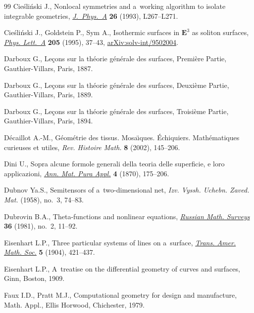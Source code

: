 \documentclass[pdftex]{sigma}
\numberwithin{equation}{section}
\begin{document}
\begin{thebibliography}{99}
Cie\'sli\'nski J., Nonlocal symmetries and a~working algorithm to isolate
  integrable geometries, \href{https://doi.org/10.1088/0305-4470/26/5/017}{\textit{J.~Phys.~A}} \textbf{26} (1993), L267--L271.

Cie\'sli\'nski J., Goldstein P., Sym A., Isothermic surfaces in
  {$\mathbf{E}^3$} as soliton surfaces, \href{https://doi.org/10.1016/0375-9601(95)00504-V}{\textit{Phys. Lett.~A}} \textbf{205}
  (1995), 37--43, \href{https://arxiv.org/abs/solv-int/9502004}{arXiv:solv-int/9502004}.

Darboux G., Le\c{c}ons sur la th\'eorie g\'en\'erale des surfaces, Premi\`ere
  Partie, Gauthier-Villars, Paris, 1887.

Darboux G., Le\c{c}ons sur la th\'eorie g\'en\'erale des surfaces, Deuxi\`eme
  Partie, Gauthier-Villars, Paris, 1889.

Darboux G., Le\c{c}ons sur la th\'eorie g\'en\'erale des surfaces, Troisi\`eme
  Partie, Gauthier-Villars, Paris, 1894.

D\'ecaillot A.-M., G\'eom\'etrie des tissus. {M}osa\"{\i}ques. \'Echiquiers.
  {M}ath\'ematiques curieuses et utiles, \textit{Rev. Histoire Math.}
  \textbf{8} (2002), 145--206.

Dini U., Sopra alcune formole generali della teoria delle superficie, e loro
  applicazioni, \href{https://doi.org/10.1007/BF02420031}{\textit{Ann. Mat. Pura Appl.}} \textbf{4} (1870), 175--206.

Dubnov Ya.S., Semitensors of a~two-dimensional net, \textit{Izv. Vyssh. Uchebn.
  Zaved. Mat.}  (1958), no.~3, 74--83.

Dubrovin B.A., Theta-functions and nonlinear equations, \href{https://doi.org/10.1070/RM1981v036n02ABEH002596}{\textit{Russian Math.
  Surveys}} \textbf{36} (1981), no.~2, 11--92.

Eisenhart L.P., Three particular systems of lines on a~surface, \href{https://doi.org/10.2307/1986272}{\textit{Trans.
  Amer. Math. Soc.}} \textbf{5} (1904), 421--437.

Eisenhart L.P., A~treatise on the differential geometry of curves and surfaces,
  Ginn, Boston, 1909.

Faux I.D., Pratt M.J., Computational geometry for design and manufacture, Math.
  Appl., Ellis Horwood, Chichester, 1979.


\end{thebibliography}
\end{document}
